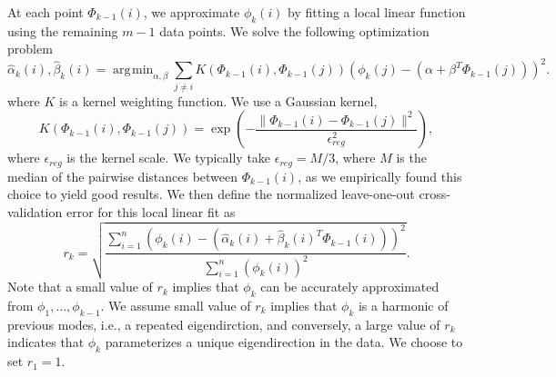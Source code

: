 \documentclass[3p]{elsarticle}
\DeclareMathOperator*{\argmin}{\arg\!\min}
\begin{document}
At each point $\Phi_{k-1}(i)$, we approximate $\phi_k(i)$ by fitting a local linear function using the remaining $m-1$ data points. 
%
We solve the following optimization problem 
\begin{equation} \label{eq:opt_problem}
\hat{\alpha}_k (i) , \hat{\beta}_k(i)  = \argmin_{\alpha, \beta} \sum_{j \ne i} K(\Phi_{k-1}(i), \Phi_{k-1}(j)) \left( \phi_{k}(j) - (\alpha + \beta^T \Phi_{k-1}(j)) \right)^2.
\end{equation}
%
where $K$ is a kernel weighting function.
%
We use a Gaussian kernel, 
%
\begin{equation}
K(\Phi_{k-1}(i), \Phi_{k-1}(j))  = \exp \left( - \frac{\|\Phi_{k-1}(i) - \Phi_{k-1} (j) \|^2}{\epsilon_{reg}^2} \right),
\end{equation}
%
where $\epsilon_{reg}$ is the kernel scale. 
%
We typically take $\epsilon_{reg} = M / 3$, where $M$ is the median of the pairwise distances between $\Phi_{k-1}(i)$, as we empirically found this choice to yield good results. 
%
We then define the normalized leave-one-out cross-validation error for this local linear fit as
\begin{equation} \label{eq:cv_error}
r_{k} = \sqrt{ \frac{\sum_{i=1}^n \left( \phi_{k} (i) - (\hat{\alpha}_k(i) + \hat{\beta}_k(i)^T \Phi_{k-1}(i))  \right)^2} {\sum_{i=1}^n  \left( \phi_{k} (i) \right)^2 }}.
\end{equation}
%
Note that a small value of $r_k$ implies that $\phi_{k}$ can be accurately approximated from $\phi_1, \dots, \phi_{k-1}$. 
%
We assume small value of $r_k$ implies that $\phi_k$ is a harmonic of previous modes, i.e., a repeated eigendirction, and conversely, a large value of $r_{k}$ indicates that $\phi_{k}$ parameterizes a unique eigendirection in the data.
%
We choose to set $r_1 = 1$.
\end{document}
